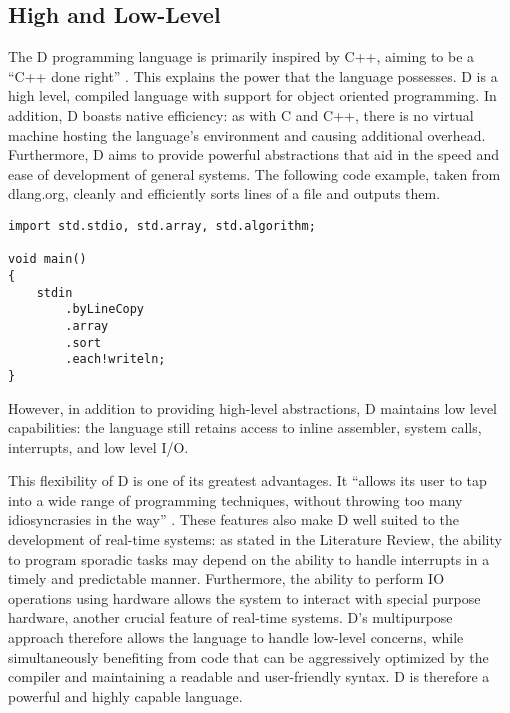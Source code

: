\subsection{High and Low-Level}
The D programming language is primarily inspired by C++, aiming to be a ``C++ done
right'' 
\cite{qznc-tutorial}. 
This explains the power that the language possesses. D is a high level, compiled 
language with support for object oriented programming. In addition, D boasts 
native efficiency: as with C and C++, there is no virtual 
machine hosting the language's environment and causing additional overhead. 
Furthermore, D aims to provide
powerful abstractions that aid in the speed and ease of development of general systems. 
The following code example, taken from dlang.org, cleanly and efficiently 
sorts lines of a file and outputs them. 
\begin{lstlisting}
import std.stdio, std.array, std.algorithm;

void main()
{
    stdin
        .byLineCopy
        .array
        .sort
        .each!writeln;
}
\end{lstlisting}
However, in addition to providing high-level abstractions, D maintains low 
level capabilities: the language still retains access to inline assembler, 
system calls, interrupts, and low level I/O.
\par\bigskip\noindent
This flexibility of D is one of its greatest advantages. It ``allows its user to tap 
into a wide range of programming techniques, without throwing too many 
idiosyncrasies in the way'' \cite{ddili-book}. 
These features also make D well suited to the development of real-time systems: 
as stated in the Literature Review, the ability to program sporadic tasks
may depend on the ability to handle interrupts in a timely and predictable manner.
Furthermore, the ability to perform IO operations using hardware allows the
system to interact with special purpose hardware, another crucial feature of
real-time systems.
D's multipurpose approach therefore allows the language to handle low-level concerns,
while simultaneously benefiting from code that can be aggressively optimized by the
compiler \cite{dlang-overview} and maintaining a readable and user-friendly
syntax. D is therefore a powerful and highly capable language.


